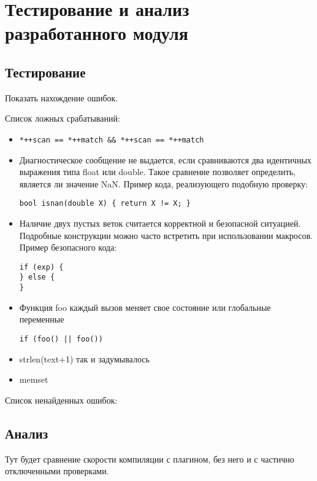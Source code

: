 \chapter{Тестирование и анализ разработанного модуля}

\section{Тестирование}
Показать нахождение ошибок. 

Список ложных срабатываний:
\begin{itemize}
	\item 
\begin{lstlisting}
*++scan == *++match && *++scan == *++match
\end{lstlisting}

	\item 
Диагностическое сообщение не выдается, если сравниваются два идентичных выражения типа float или double. 
Такое сравнение позволяет определить, является ли значение NaN. Пример кода, реализующего подобную проверку:
\begin{lstlisting}
bool isnan(double X) { return X != X; }
\end{lstlisting}

	\item
Наличие двух пустых веток считается корректной и безопасной ситуацией. Подробные конструкции 
можно часто встретить при использовании макросов. Пример безопасного кода:
\begin{lstlisting}
if (exp) {
} else {
}
\end{lstlisting}

	\item Функция foo каждый вызов меняет свое состояние или глобальные переменные 
\begin{lstlisting}
if (foo() || foo())
\end{lstlisting}
	
	\item strlen(text+1) так и задумывалось
	
	\item memset 
	
\end{itemize}

Список ненайденных ошибок:

\section{Анализ}

Тут будет сравнение скорости компиляции с плагином, без него и с частично отключенными проверками.